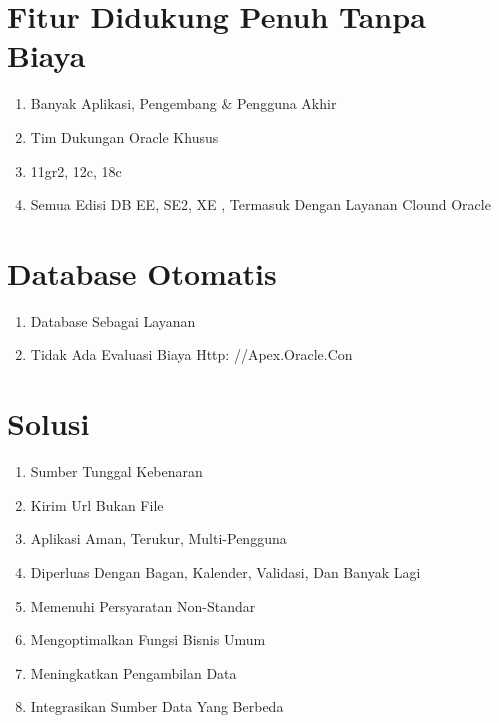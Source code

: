 \documentclass{article}
\begin{document}
\section{Fitur Didukung Penuh Tanpa Biaya}
    \begin{enumerate}
    \item Banyak Aplikasi, Pengembang & Pengguna Akhir
    \item Tim Dukungan Oracle Khusus
    \item 11gr2, 12c, 18c
    \item Semua Edisi DB EE, SE2, XE , Termasuk Dengan Layanan Clound Oracle

    \end{enumerate}

\section {Database Otomatis}
    \begin{enumerate}
        \item Database Sebagai Layanan
        \item Tidak Ada Evaluasi Biaya Http: //Apex.Oracle.Con

    \end{enumerate}

\section{Solusi}
\begin{enumerate}
    \item Sumber Tunggal Kebenaran
    \item Kirim Url Bukan File
    \item Aplikasi Aman, Terukur, Multi-Pengguna
    \item Diperluas Dengan Bagan, Kalender, Validasi, Dan     Banyak Lagi
    \item Memenuhi Persyaratan Non-Standar
    \item Mengoptimalkan Fungsi Bisnis Umum
    \item Meningkatkan Pengambilan Data
    \item Integrasikan Sumber Data Yang Berbeda

\end{enumerate}
\end{document}
